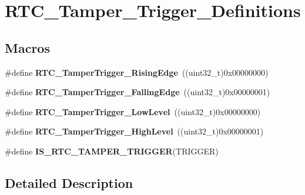 \hypertarget{group___r_t_c___tamper___trigger___definitions}{\section{R\-T\-C\-\_\-\-Tamper\-\_\-\-Trigger\-\_\-\-Definitions}
\label{group___r_t_c___tamper___trigger___definitions}
}
\subsection*{Macros}
\begin{DoxyCompactItemize}
\item 
\hypertarget{group___r_t_c___tamper___trigger___definitions_ga92ced18ec15722a30334a4df73ab046e}{\#define {\bfseries R\-T\-C\-\_\-\-Tamper\-Trigger\-\_\-\-Rising\-Edge}~((uint32\-\_\-t)0x00000000)}\label{group___r_t_c___tamper___trigger___definitions_ga92ced18ec15722a30334a4df73ab046e}

\item 
\hypertarget{group___r_t_c___tamper___trigger___definitions_ga9c78b3d15d85c5bd32c3003effe84b3d}{\#define {\bfseries R\-T\-C\-\_\-\-Tamper\-Trigger\-\_\-\-Falling\-Edge}~((uint32\-\_\-t)0x00000001)}\label{group___r_t_c___tamper___trigger___definitions_ga9c78b3d15d85c5bd32c3003effe84b3d}

\item 
\hypertarget{group___r_t_c___tamper___trigger___definitions_ga823f204682b5fab1d5b8aa053c53f97d}{\#define {\bfseries R\-T\-C\-\_\-\-Tamper\-Trigger\-\_\-\-Low\-Level}~((uint32\-\_\-t)0x00000000)}\label{group___r_t_c___tamper___trigger___definitions_ga823f204682b5fab1d5b8aa053c53f97d}

\item 
\hypertarget{group___r_t_c___tamper___trigger___definitions_gac7d32f8fc0730428bbeaa1927fb36d01}{\#define {\bfseries R\-T\-C\-\_\-\-Tamper\-Trigger\-\_\-\-High\-Level}~((uint32\-\_\-t)0x00000001)}\label{group___r_t_c___tamper___trigger___definitions_gac7d32f8fc0730428bbeaa1927fb36d01}

\item 
\#define {\bfseries I\-S\-\_\-\-R\-T\-C\-\_\-\-T\-A\-M\-P\-E\-R\-\_\-\-T\-R\-I\-G\-G\-E\-R}(T\-R\-I\-G\-G\-E\-R)
\end{DoxyCompactItemize}


\subsection{Detailed Description}


